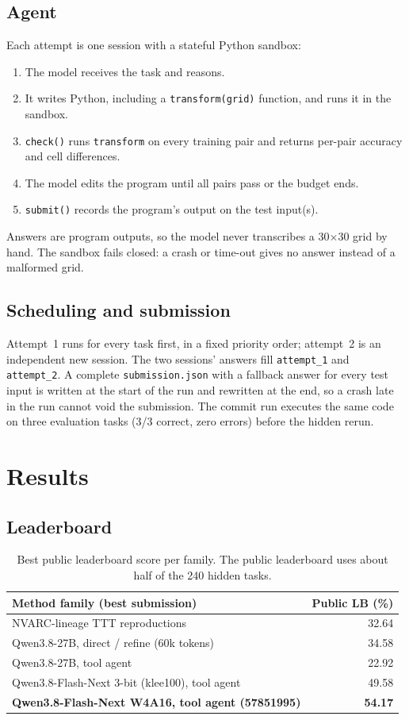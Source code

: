 \documentclass[11pt]{article}
\begin{document}
\subsection{Agent}
Each attempt is one session with a stateful Python sandbox:
\begin{enumerate}
\item The model receives the task and reasons.
\item It writes Python, including a \texttt{transform(grid)} function, and runs it in the sandbox.
\item \texttt{check()} runs \texttt{transform} on every training pair and returns per-pair accuracy and cell differences.
\item The model edits the program until all pairs pass or the budget ends.
\item \texttt{submit()} records the program's output on the test input(s).
\end{enumerate}
Answers are program outputs, so the model never transcribes a 30$\times$30 grid by hand. The sandbox fails closed: a crash or time-out gives no answer instead of a malformed grid.

\subsection{Scheduling and submission}
Attempt~1 runs for every task first, in a fixed priority order; attempt~2 is an independent new session. The two sessions' answers fill \texttt{attempt\_1} and \texttt{attempt\_2}. A complete \texttt{submission.json} with a fallback answer for every test input is written at the start of the run and rewritten at the end, so a crash late in the run cannot void the submission. The commit run executes the same code on three evaluation tasks (3/3 correct, zero errors) before the hidden rerun.

\section{Results}
\subsection{Leaderboard}
\begin{table}[h]
\centering\small
\begin{tabular}{@{}lr@{}}
\toprule
Method family (best submission) & Public LB (\%) \\
\midrule
NVARC-lineage TTT reproductions & 32.64 \\
Qwen3.8-27B, direct / refine (60k tokens) & 34.58 \\
Qwen3.8-27B, tool agent & 22.92 \\
Qwen3.8-Flash-Next 3-bit (klee100), tool agent & 49.58 \\
\textbf{Qwen3.8-Flash-Next W4A16, tool agent (57851995)} & \textbf{54.17} \\
\bottomrule
\end{tabular}
\caption{Best public leaderboard score per family. The public leaderboard uses about half of the 240 hidden tasks.}
\label{tab:lb}
\end{table}
\end{document}
